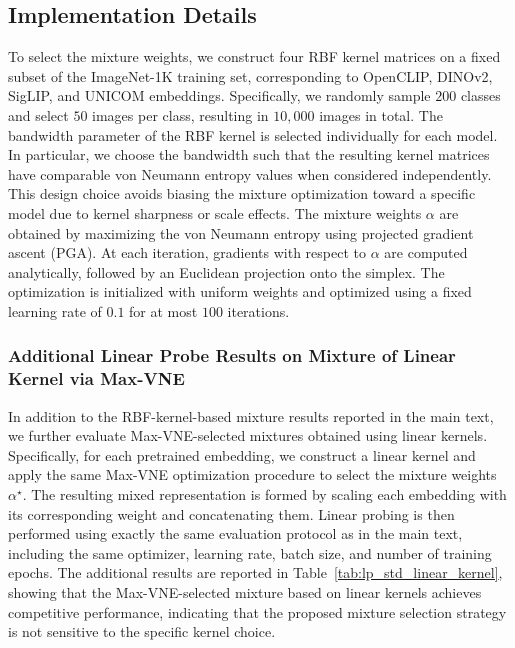\documentclass{article}
\theoremstyle{plain}
\theoremstyle{definition}
\begin{document}
\begin{appendices}
\subsection{Implementation Details}
To select the mixture weights, we construct four RBF kernel matrices on a fixed subset of the ImageNet-1K training set, corresponding to OpenCLIP, DINOv2, SigLIP, and UNICOM embeddings.
Specifically, we randomly sample $200$ classes and select $50$ images per class, resulting in $10{,}000$ images in total.
The bandwidth parameter of the RBF kernel is selected individually for each model.
In particular, we choose the bandwidth such that the resulting kernel matrices have comparable von Neumann entropy values when considered independently.
This design choice avoids biasing the mixture optimization toward a specific model due to kernel sharpness or scale effects.
The mixture weights $\alpha$ are obtained by maximizing the von Neumann entropy using projected gradient ascent (PGA).
At each iteration, gradients with respect to $\alpha$ are computed analytically, followed by an Euclidean projection onto the simplex.
The optimization is initialized with uniform weights and optimized using a fixed learning rate of $0.1$ for at most $100$ iterations.

\subsubsection{Additional Linear Probe Results on Mixture of Linear Kernel via Max-VNE}
In addition to the RBF-kernel-based mixture results reported in the main text, we further evaluate Max-VNE-selected mixtures obtained using linear kernels.
Specifically, for each pretrained embedding, we construct a linear kernel and apply the same Max-VNE optimization procedure to select the mixture weights $\alpha^\star$.
The resulting mixed representation is formed by scaling each embedding with its corresponding weight and concatenating them.
Linear probing is then performed using exactly the same evaluation protocol as in the main text, including the same optimizer, learning rate, batch size, and number of training epochs.
The additional results are reported in Table~\ref{tab:lp_std_linear_kernel}, showing that the Max-VNE-selected mixture based on linear kernels achieves competitive performance, indicating that the proposed mixture selection strategy is not sensitive to the specific kernel choice.





\end{appendices}
\end{document}
